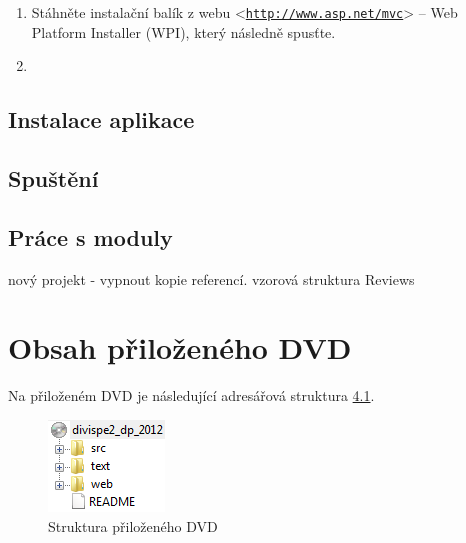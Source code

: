 \documentclass[11pt,twoside,a4paper]{book}
\let\oldUrl\url
\renewcommand\url[1]{<\texttt{\oldUrl{#1}}>}
\begin{document}
\begin{enumerate}
\item Stáhněte instalační balík z webu \url{http://www.asp.net/mvc} -- Web Platform Installer (WPI), který následně spusťte.


\item 
\end{enumerate}




\section{Instalace aplikace}
\section{Spuštění}
\section{Práce s moduly}
nový projekt - vypnout kopie referencí. vzorová struktura Reviews

\chapter{Obsah přiloženého DVD}

Na přiloženém DVD je následující adresářová struktura \ref{fig:seznamcd}.

\begin{figure}[h]
\begin{center}
\includegraphics[scale=1]{figures/cd}
\caption{Struktura přiloženého DVD}
\label{fig:seznamcd}
\end{center}
\end{figure}
\end{document}
